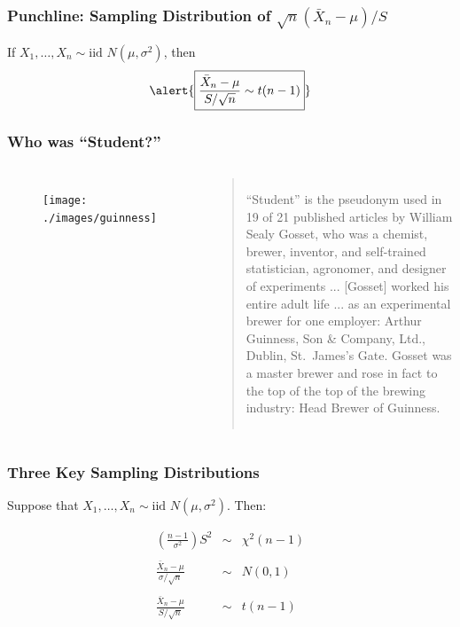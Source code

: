 \documentclass{beamer}
\begin{document}
\begin{frame}
\frametitle{Punchline: Sampling Distribution of $\sqrt{n}(\bar{X}_n-\mu)/S$}
If $X_1, \hdots, X_n \sim \mbox{iid } N(\mu,\sigma^2)$, then
	$$\alert{\boxed{\frac{\bar{X}_n - \mu}{S/\sqrt{n}} \sim t(n-1)}}$$
\end{frame}

\begin{frame}
\frametitle{Who was ``Student?''}
\begin{columns}

\begin{figure}
\vspace{0.75em}

\texttt{[image: ./images/guinness]}
\end{figure}


\footnotesize
\begin{quote}
``Student'' is the pseudonym used in 19 of 21 published articles by William Sealy
Gosset, who was a chemist, brewer, inventor, and self-trained statistician, agronomer, and designer of experiments ... [Gosset] worked his entire adult life ... as an experimental brewer for one employer: Arthur Guinness, Son \& Company, Ltd., Dublin, St.\ James’s Gate. Gosset was a master brewer and rose in fact to the top of the top of the brewing industry: Head Brewer of Guinness. \href{http://pubs.aeaweb.org/doi/pdfplus/10.1257/jep.22.4.199}{\color{blue}{Source}}
\end{quote}

\end{columns}

\end{frame}

\begin{frame}
\frametitle{Three Key Sampling Distributions}
Suppose that $X_1, \hdots, X_n \sim \mbox{iid } N(\mu,\sigma^2)$. Then:

	\begin{eqnarray*}
		\left(\frac{n-1}{\sigma^2}\right) S^2&\sim&\chi^2(n-1)\\ \\
		\frac{\bar{X}_n-\mu}{\sigma/\sqrt{n}}&\sim& N(0,1)\\ \\
		\frac{\bar{X}_n-\mu}{S/\sqrt{n}}&\sim&t(n-1)
	\end{eqnarray*}
\end{frame}
\end{document}
